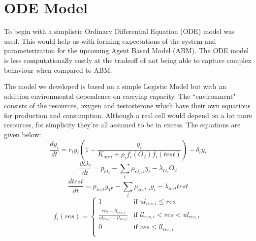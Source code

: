 \section{ODE Model}
To begin with a simplistic Ordinary Differential Equation (ODE) model was used. This would help us with forming expectations of the system and parameterization for the upcoming Agent Based Model (ABM). The ODE model is less computationally costly at the tradeoff of not being able to capture complex behaviour when compared to ABM.

The model we developed is based on a simple Logistic Model \cite{Logistic} but with an addition environmental dependence on carrying capacity. The ``environment" consists of the resources, oxygen and testosterone which have their own equations for production and consumption. Although a real cell would depend on a lot more resources, for simplicity they're all assumed to be in excess. The equations are given below:
\begin{equation}
  \frac{dy_i}{dt} = r_i y_i (1 - \frac{y_i}{K_{min} + \rho_i f_i(O_2) f_i(test)} )- \delta_i y_i
  \label{celleq}
\end{equation}
\begin{equation}
  \frac{dO_2}{dt} = p_{O_2} - \sum_i \mu_{O_2,i} y_i - \lambda_{O_2} O_2
  \label{o2eq}
\end{equation}
\begin{equation}
  \frac{dtest}{dt} = p_{test} y_{T^p} - \sum_i \mu_{test,i} y_i - \lambda_{test} test
  \label{testeq}
\end{equation}
\begin{equation}
  f_i(res) = \begin{cases}
    1 &\text{if } ul_{res,i} \leq res\\
    \frac{res-ll_{res,i}}{ul_{res,i}-ll_{res,i}} &\text{if } ll_{res,i} < res < ul_{res,i}\\
    0 &\text{if } res \leq ll_{res,i}\\
  \end{cases}
  \label{freseq}
\end{equation}


